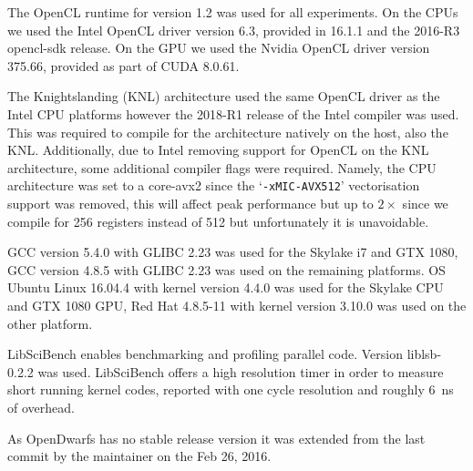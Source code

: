 \documentclass[../document.tex]{subfiles}
\begin{document}
\label{ssec:software}

The OpenCL runtime for version 1.2 was used for all experiments.
On the CPUs we used the Intel OpenCL driver version 6.3, provided in 16.1.1 and the 2016-R3 opencl-sdk release.
On the GPU we used the Nvidia OpenCL driver version 375.66, provided as part of CUDA 8.0.61.

The Knightslanding (KNL) architecture used the same OpenCL driver as the Intel CPU platforms however the 2018-R1 release of the Intel compiler was used.
This was required to compile for the architecture natively on the host, also the KNL.
Additionally, due to Intel removing support for OpenCL on the KNL architecture, some additional compiler flags were required.
Namely, the CPU architecture was set to a core-avx2 since the `{\tt -xMIC-AVX512}' vectorisation support was removed, this will affect peak performance but up to $2\times$ since we compile for \SI{256}{\bit} registers instead of \SI{512}{\bit} but unfortunately it is unavoidable.

GCC version 5.4.0 with GLIBC 2.23 was used for the Skylake i7 and GTX 1080,  
GCC version 4.8.5 with GLIBC 2.23 was used on the remaining platforms.
OS Ubuntu Linux 16.04.4 with kernel version 4.4.0 was used for the Skylake CPU and GTX 1080 GPU, Red Hat 4.8.5-11 with kernel version 3.10.0 was used on the other platform.

LibSciBench enables benchmarking and profiling parallel code.
Version liblsb-0.2.2 was used.
LibSciBench offers a high resolution timer in order to measure short running kernel codes, reported with one cycle resolution and roughly \SI{6}{\nano\second} of overhead.

As OpenDwarfs has no stable release version it was extended from the last commit by the maintainer on the Feb 26, 2016.
\end{document}
